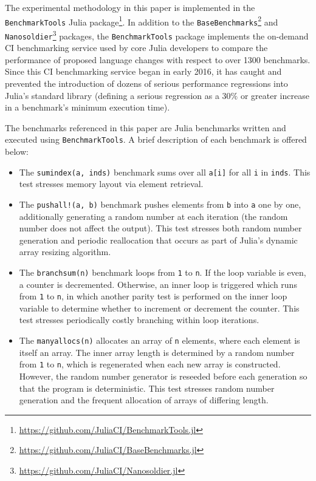 \documentclass[conference]{IEEEtran}
\begin{document}
The experimental methodology in this paper is implemented in the
\lstinline|BenchmarkTools| Julia
package\footnote{\url{https://github.com/JuliaCI/BenchmarkTools.jl}}. In
addition to the
\lstinline|BaseBenchmarks|\footnote{\url{https://github.com/JuliaCI/BaseBenchmarks.jl}}
and
\lstinline|Nanosoldier|\footnote{\url{https://github.com/JuliaCI/Nanosoldier.jl}}
packages, the \lstinline|BenchmarkTools| package implements the on-demand CI
benchmarking service used by core Julia developers to compare the performance
of proposed language changes with respect to over 1300 benchmarks. Since this
CI benchmarking service began in early 2016, it has caught and prevented the
introduction of dozens of serious performance regressions into Julia's standard
library (defining a serious regression as a $30\%$ or greater increase in a
benchmark's minimum execution time).

The benchmarks referenced in this paper are Julia benchmarks written and
executed using \lstinline|BenchmarkTools|. A brief description of each
benchmark is offered below:

\begin{itemize}
    \item The \lstinline|sumindex(a, inds)| benchmark sums over all
\lstinline|a[i]| for all \lstinline|i| in \lstinline|inds|. This test stresses
memory layout via element retrieval.
    \item The \lstinline|pushall!(a, b)| benchmark pushes elements from \lstinline|b| into
    \lstinline|a| one by one, additionally generating a random number at each iteration (the
    random number does not affect the output). This test stresses both random number
    generation and periodic reallocation that occurs as part of Julia's dynamic array
    resizing algorithm.
    \item The \lstinline|branchsum(n)| benchmark loops from \lstinline|1| to \lstinline|n|.
    If the loop variable is even, a counter is decremented. Otherwise, an inner loop is
    triggered which runs from \lstinline|1| to \lstinline|n|, in which another parity test
    is performed on the inner loop variable to determine whether to increment or decrement
    the counter. This test stresses periodically costly branching within loop iterations.
    \item The \lstinline|manyallocs(n)| allocates an array of \lstinline|n| elements, where
    each element is itself an array. The inner array length is determined by a random number
    from \lstinline|1| to \lstinline|n|, which is regenerated when each new array is
    constructed. However, the random number generator is reseeded before each generation so
    that the program is deterministic. This test stresses random number generation and
    the frequent allocation of arrays of differing length.
\end{itemize}
\end{document}
